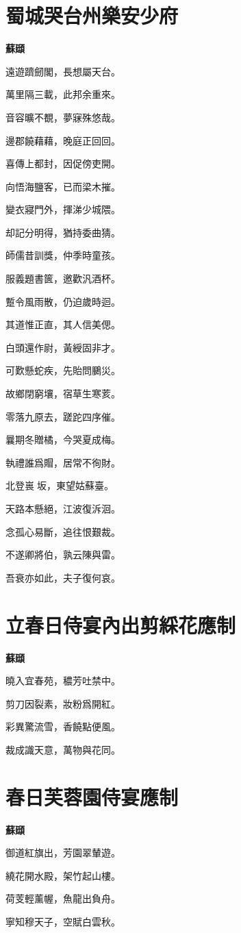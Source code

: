 \documentclass[12pt,a4paper]{ctexbook}
\begin{document}
\section{蜀城哭台州樂安少府}
\textbf{蘇頲}\par\vspace{0.5em}
遠遊躋劒閣，長想屬天台。\par
萬里隔三載，此邦余重來。\par
音容曠不覩，夢寐殊悠哉。\par
邊郡饒藉藉，晚庭正回回。\par
喜傳上都封，因促傍吏開。\par
向悟海鹽客，已而梁木摧。\par
變衣寢門外，揮涕少城隈。\par
却記分明得，猶持委曲猜。\par
師儒昔訓獎，仲季時童孩。\par
服義題書篋，邀歡汎酒杯。\par
蹔令風雨散，仍迫歲時迴。\par
其道惟正直，其人信美偲。\par
白頭還作尉，黃綬固非才。\par
可歎懸蛇疾，先貽問鵩災。\par
故鄉閉窮壤，宿草生寒荄。\par
零落九原去，蹉跎四序催。\par
曩期冬贈橘，今哭夏成梅。\par
執禮誰爲賵，居常不徇財。\par
北登嵔𡻱坂，東望姑蘇臺。\par
天路本懸絕，江波復泝洄。\par
念孤心易斷，追往恨艱裁。\par
不遂卿將伯，孰云陳與雷。\par
吾衰亦如此，夫子復何哀。\par

\section{立春日侍宴內出剪綵花應制}
\textbf{蘇頲}\par\vspace{0.5em}
曉入宜春苑，穠芳吐禁中。\par
剪刀因裂素，妝粉爲開紅。\par
彩異驚流雪，香饒點便風。\par
裁成識天意，萬物與花同。\par

\section{春日芙蓉園侍宴應制}
\textbf{蘇頲}\par\vspace{0.5em}
御道紅旗出，芳園翠輦遊。\par
繞花開水殿，架竹起山樓。\par
荷芰輕薰幄，魚龍出負舟。\par
寧知穆天子，空賦白雲秋。\par
\end{document}

